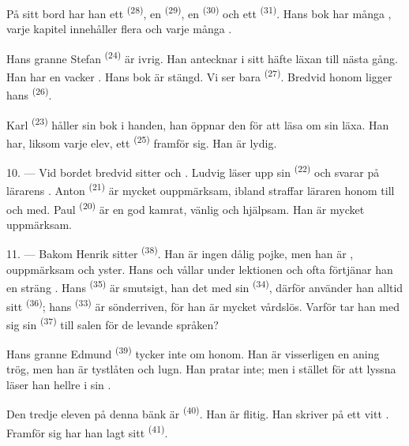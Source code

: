 På sitt bord har han ett  \textsuperscript{(28)}, en
 \textsuperscript{(29)}, en 
\textsuperscript{(30)} och ett  \textsuperscript{(31)}. Hans bok har många
, varje kapitel innehåller flera  och varje  många
.

Hans granne Stefan \textsuperscript{(24)} är ivrig. Han antecknar i sitt häfte läxan till
nästa gång. Han har en vacker . Hans bok är stängd. Vi ser bara
 \textsuperscript{(27)}. Bredvid honom ligger hans
 \textsuperscript{(26)}.

Karl \textsuperscript{(23)} håller sin bok i handen, han öppnar den för att läsa om sin läxa.
Han har, liksom varje elev, ett  \textsuperscript{(25)} framför sig. Han är
lydig.

10. --- Vid bordet bredvid sitter  och . Ludvig läser upp
sin  \textsuperscript{(22)} och svarar på lärarens
. Anton \textsuperscript{(21)} är mycket ouppmärksam, ibland
straffar läraren honom till och med. Paul \textsuperscript{(20)} är en god kamrat, vänlig och
hjälpsam. Han är mycket uppmärksam.

\VUsaut{4.2mm}
\VUsaut{3.2mm}

11. --- Bakom Henrik sitter  \textsuperscript{(38)}. Han är ingen dålig pojke,
men han är , ouppmärksam och yster. Hans
 och  vållar  under
lektionen och ofta förtjänar han en sträng . Hans
 \textsuperscript{(35)} är smutsigt, han  det
 med sin  \textsuperscript{(34)}, därför
använder han alltid sitt  \textsuperscript{(36)}; hans
 \textsuperscript{(33)} är sönderriven, för han är mycket
vårdslös. Varför tar han med sig sin  \textsuperscript{(37)} till salen
för de levande språken?

Hans granne Edmund \textsuperscript{(39)} tycker inte om honom. Han är visserligen en aning
trög, men han är tystlåten och lugn. Han pratar inte; men i stället för att lyssna läser han
hellre  i sin .

Den tredje eleven på denna bänk är  \textsuperscript{(40)}. Han är flitig. Han
skriver på ett vitt . Framför sig har han lagt sitt 
\textsuperscript{(41)}.

